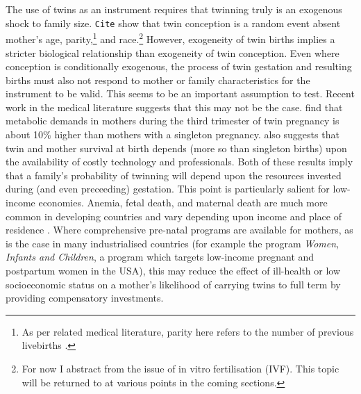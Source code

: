 \documentclass{article}[11pt,subeqn]
\begin{document}
\begin{spacing}{1.25}
The use of twins as an instrument requires that twinning truly is an exogenous shock to family size.  \texttt{Cite} show that twin conception is a random event absent mother's age, 
parity,\footnote{As per related medical literature, parity here refers to the number of previous livebirths \citep{Elwood1978}.} and race.\footnote{For now I abstract from 
the issue of in vitro fertilisation (IVF).  This topic will be returned to at various points in the coming sections.} However, exogeneity of twin births implies a stricter 
biological relationship than exogeneity of twin conception.  Even where conception is conditionally exogenous, the process of twin gestation and resulting births must also 
not respond to mother or family characteristics for the instrument to be valid.  This seems to be an important assumption to test.  Recent work in the medical literature 
suggests that this may not be the case. \citet{Shinagawaetal2005} find that metabolic demands in mothers during the third trimester of twin pregnancy is about 10\% higher 
than mothers with a singleton pregnancy. \citet{Philipson2008}  also suggests that twin and mother survival at birth depends (more so than singleton births) upon the availability 
of costly technology and professionals.  Both of these results imply that a family's probability of twinning will depend upon the resources invested during (and even preceeding) 
gestation.  This point is particularly salient for low-income economies.  Anemia, fetal death, and maternal death are much more common in developing countries and vary depending 
upon income and place of residence \citep{Rush2000}.  Where comprehensive pre-natal programs are available for mothers, as is the case in many industrialised countries (for 
example the program \emph{Women, Infants and Children}, a program which targets low-income pregnant and postpartum women in the USA), this 
may reduce the effect of ill-health or low socioeconomic status on a mother's likelihood of carrying twins to full term by providing compensatory investments.


\end{spacing}
\end{document}
